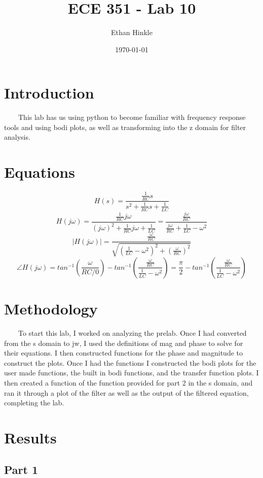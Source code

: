 \documentclass[11pt,a4]{article}
\title{ECE 351 - Lab 10}
\author{Ethan Hinkle}
\date{\today}
\begin{document}
\maketitle

\section{Introduction}

\ \ \ \ This lab has us using python to become familiar with frequency response tools and using bodi plots, as well as transforming into the z domain for filter  analysis.   

\section{Equations}

$$H(s) = \frac{\frac{1}{RC}s}{s^2+\frac{1}{RC}s+\frac{1}{LC}}$$
$$H(j\omega) = \frac{\frac{1}{RC}j\omega}{(j\omega)^2+\frac{1}{RC}j\omega+\frac{1}{LC}} = \frac{\frac{j\omega}{RC}}{\frac{j\omega}{RC}+\frac{1}{LC}-\omega^2}$$
$$|H(j\omega)| = \frac{\frac{\omega}{RC}}{\sqrt{(\frac{1}{LC}-\omega^2)^2+(\frac{\omega}{RC})^2}}$$
$$\angle H(j\omega)=tan^{-1}(\frac{\omega}{RC/0})-tan^{-1}(\frac{\frac{\omega}{RC}}{\frac{1}{LC}-\omega^2}) = \frac{\pi}{2}-tan^{-1}(\frac{\frac{\omega}{RC}}{\frac{1}{LC}-\omega^2})$$

\section{Methodology}

\ \ \ \ To start this lab, I worked on analyzing the prelab. Once I had converted from the s domain to jw, I used the definitions of mag and phase to solve for their equations. I then constructed functions for the phase and magnitude to construct the  plots. Once I had the functions I constructed the bodi plots for the user made functions, the built in bodi functions, and the transfer function plots. I then created a function of the function provided for part 2 in the s domain, and ran it through a plot of the filter as well as the output of the filtered equation, completing the lab.

\section{Results}

\subsection{Part 1}
\end{document}
